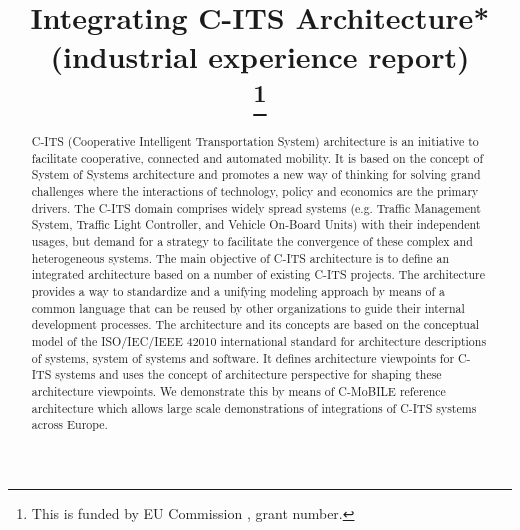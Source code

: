\documentclass[conference]{IEEEtran}
\begin{document}
\title{Integrating C-ITS Architecture* (industrial experience report)\\
\thanks{This is funded by EU Commission , grant number.}
}

\author{
\and
{}
\and
{}
}

\maketitle

\begin{abstract}
	C-ITS (Cooperative Intelligent Transportation System) architecture  is an initiative to facilitate cooperative, connected and automated mobility. It is based on the concept of System of Systems architecture and promotes a new way of thinking for solving grand challenges where the interactions of technology, policy and economics are the primary drivers. The C-ITS domain comprises widely spread systems (e.g. Traffic Management System, Traffic Light Controller, and Vehicle On-Board Units) with their independent usages, but demand for a strategy to facilitate the convergence of these complex and heterogeneous systems. The main objective of C-ITS architecture is to define an integrated architecture based on a number of existing C-ITS projects. The architecture provides a way to standardize and a unifying modeling approach by means of a common language that can be reused by other organizations to guide their internal development processes. The architecture and its concepts are based on the conceptual model of the ISO/IEC/IEEE 42010\cite{iso42010} international standard for architecture descriptions of systems, system of systems and software. It defines architecture viewpoints for C-ITS systems and uses the concept of architecture perspective for shaping these architecture viewpoints. We demonstrate this by means of C-MoBILE reference architecture which allows large scale demonstrations of integrations of C-ITS systems across Europe.
\end{abstract}
\end{document}
